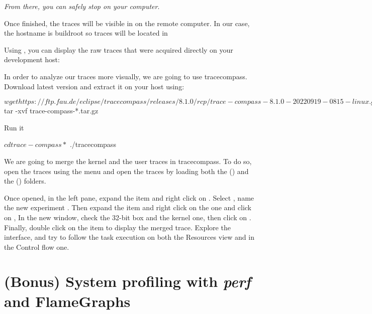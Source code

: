 {\em From there, you can safely stop  on your computer}.

Once finished, the traces will be visible in 
on the remote computer.
In our case, the hostname is buildroot so traces will be
located in 

Using , you can display the raw traces that were acquired directly
on your development host:

In order to analyze our traces more visually, we are going to use tracecompass.
Download  latest version and extract it on your host using:

\begin{bashinput}
$ wget https://ftp.fau.de/eclipse/tracecompass/releases/8.1.0/rcp/trace-compass-8.1.0-20220919-0815-linux.gtk.x86_64.tar.gz
$ tar -xvf trace-compass-*.tar.gz
\end{bashinput}

Run it
\begin{bashinput}
$ cd trace-compass*
$ ./tracecompass
\end{bashinput}

We are going to merge the kernel and the user traces in tracecompass. To do so,
open the traces using the  menu and open the traces
by loading both the  () and the 
() folders.

Once opened, in the left pane, expand the  item and right click
on . Select , name the new experiment
. Then expand the  item and right click on
the  one and click on , In the new
window, check the 32-bit box and the kernel one, then click on .
Finally, double click on the  item to display the merged
trace. Explore the interface, and try to follow the task execution on both the
Resources view and in the Control flow one.

\section{(Bonus) System profiling with {\em perf} and FlameGraphs}

